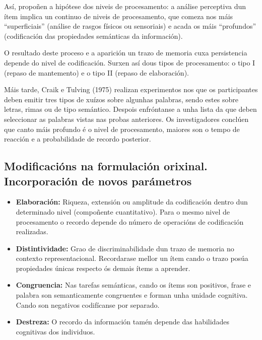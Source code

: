 \documentclass[a4paper,11pt]{article}
\begin{document}
Así, propoñen a hipótese dos niveis de procesamento: a análise perceptiva dun ítem implica un continuo de niveis de procesamento, que comeza nos máis ``superficiais'' (análise de rasgos físicos ou sensoriais) e acada os máis ``profundos'' (codificación das propiedades semánticas da información). 

O resultado deste proceso e a aparición un trazo de memoria cuxa persistencia depende do nivel de codificación. Surxen así dous tipos de procesamento: o tipo I (repaso de mantemento) e o tipo II (repaso de elaboración). 

Máis tarde, Craik e Tulving (1975) realizan experimentos nos que os participantes deben emitir tres tipos de xuízos sobre algunhas palabras, sendo estes sobre letras, rimas ou de tipo semántico. Despois enfróntanse a unha lista da que deben seleccionar as palabras vistas nas probas anteriores. Os investigadores conclúen que canto máis profundo é o nivel de procesamento, maiores son o tempo de reacción e a probabilidade de recordo posterior. 

\subsection{Modificacións na formulación orixinal. Incorporación de novos parámetros}
\begin{itemize}
	\item \textbf{Elaboración:} Riqueza, extensión ou amplitude da codificación dentro dun
	determinado nivel (compoñente cuantitativo). Para o mesmo nivel de procesamento o recordo depende
	do número de operacións de codificación realizadas.
	\item \textbf{Distintividade:} Grao de discriminabilidade dun trazo de memoria no contexto
	representacional. Recordarase mellor un ítem cando o trazo posúa propiedades únicas respecto ós
	demais ítems a aprender. 
	\item \textbf{Congruencia:} Nas tarefas semánticas, cando os ítems son positivos, frase e
	palabra son semanticamente congruentes e forman unha unidade cognitiva. Cando son negativos
	codifícanse por separado.
	\item \textbf{Destreza:} O recordo da información tamén depende das habilidades cognitivas dos
	individuos. 
\end{itemize}
\end{document}
